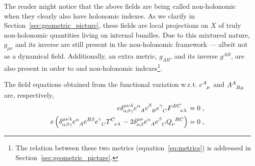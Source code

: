 \documentclass[../../main.tex]{subfiles}
\begin{document}
The reader might notice that the above fields are being called non-holonomic when they clearly also have holonomic indexes. As we clarify in Section~\ref{sec:geometric_picture}, these fields are local projections on $X$ of truly non-holonomic quantities living on internal bundles. Due to this mixtured nature, $g_{\mu\nu}$ and its inverse are still present in the non-holonomic framework --- albeit not as a dynamical field. Additionally, an extra metric, $g_{AB}$, and its inverse $g^{AB}$, are also present in order to  and  non-holonomic indexes\footnote{The relation between these two metrics (equation~\eqref{eq:metrics}) is addressed in Section~\ref{sec:geometric_picture}.}.

The field equations obtained from the functional variation w.r.t. $\tensor{e}{^A_\mu}$ and $\tensor{A}{^A_{B\mu}}$ are, respectively,
\begin{subequations}\label{eq:nonholonomic-field-eqs}
  \begin{align}
    e\delta^{\mu\nu\lambda}_{\alpha\beta\gamma}\tensor{e}{^\alpha_A}\tensor{e}{^\beta_B}\tensor{e}{^\gamma_C}\tensor{F}{^{BC}_{\nu\lambda}}                                                                                                          & = 0 \;, \label{eq:nonholonomic-einstein-like-field-eqs} \\
    e \left(\delta^{\mu\nu\lambda}_{\alpha\beta\gamma}\tensor{e}{^\alpha_A}\tensor{e}{^{B\beta}}\tensor{e}{^\gamma_C}\tensor{T}{^C_{\nu\lambda}}-2\delta^{\mu\nu}_{\alpha\beta}\tensor{e}{^\alpha_A}\tensor{e}{^\beta_C}\tensor{Q}{_\nu^{BC}}\right) & = 0 \;, \label{eq:nonholonomic-cartan-like-field-eqs}
  \end{align}
\end{subequations}
\end{document}
